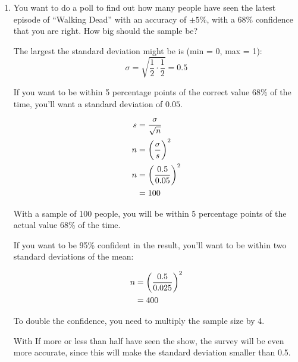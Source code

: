 \documentclass[letterpaper,landscape]{exam}
\begin{document}
  \begin{enumerate}

    \item You want to do a poll to find out how many people have seen the latest
      episode of ``Walking Dead'' with an accuracy of $\pm 5\%$, with a 68\%
      confidence that you are right. How big should the sample be? 

      \begin{solution}
        The largest the standard deviation might be is (min = 0, max = 1):
        \[
          \sigma = \sqrt{\frac{1}{2} \cdot \frac{1}{2}} = 0.5
        \]

        If you want to be within 5 percentage points of the correct value 68\%
        of the time, you'll want a standard deviation of $0.05$.

        \begin{align*}
          s & = \frac{\sigma}{\sqrt{n}} \\
          n & = \del{ \frac{\sigma}{s} }^2 \\
          n & = \del{ \frac{0.5}{0.05} }^2 \\
            & = 100 \\
        \end{align*}

        With a sample of 100 people, you will be within 5 percentage points of
        the actual value 68\% of the time.

        If you want to be 95\% confident in the result, you'll want to be within
        two standard deviations of the mean:
        
        \begin{align*}
          n & = \del{ \frac{0.5}{0.025} }^2 \\
            & = 400 \\
        \end{align*}

        To double the confidence, you need to multiply the sample size by 4.

        With If more or less than half have seen the show, the survey will be
        even more accurate, since this will make the standard deviation smaller
        than 0.5.




\end{solution}
\end{enumerate}
\end{document}
